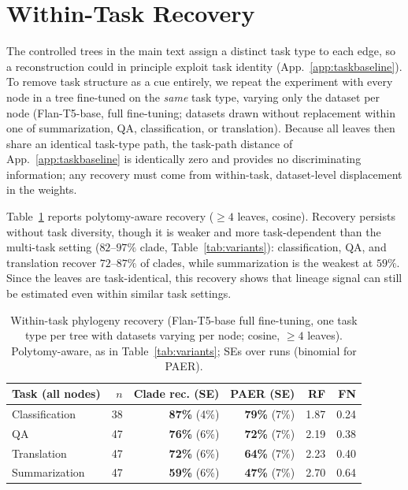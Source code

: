 \documentclass{article}
\theoremstyle{definition}
\theoremstyle{plain}
\begin{document}
\section{Within-Task Recovery}
\label{app:withintask}

The controlled trees in the main text assign a distinct task type to each edge, so a reconstruction
could in principle exploit task identity (App.~\ref{app:taskbaseline}). To remove task structure as a
cue entirely, we repeat the experiment with every node in a tree fine-tuned on the \emph{same} task
type, varying only the dataset per node (Flan-T5-base, full fine-tuning; datasets drawn without
replacement within one of summarization, QA, classification, or translation). Because all leaves then
share an identical task-type path, the task-path distance of App.~\ref{app:taskbaseline} is identically
zero and provides no discriminating information; any recovery must come from within-task,
dataset-level displacement in the weights.

Table~\ref{tab:withintask} reports polytomy-aware recovery ($\geq 4$ leaves, cosine). Recovery persists
without task diversity, though it is weaker and more task-dependent than the multi-task setting
($82$--$97\%$ clade, Table~\ref{tab:variants}): classification, QA, and translation recover $72$--$87\%$
of clades, while summarization is the weakest at $59\%$.
Since the leaves are task-identical, this recovery shows that lineage signal can still be estimated even within similar task settings.

\begin{table}[h]
\caption{Within-task phylogeny recovery (Flan-T5-base full fine-tuning, one task type per tree with
  datasets varying per node; cosine, $\geq 4$ leaves). Polytomy-aware, as in
  Table~\ref{tab:variants}; SEs over runs (binomial for PAER).}
\label{tab:withintask}
\centering
\small
\begin{tabular}{lrrrrr}
\toprule
Task (all nodes) & $n$ & Clade rec. (SE) & PAER (SE) & RF & FN \\
\midrule
Classification & 38 & \textbf{87\%} (4\%) & \textbf{79\%} (7\%) & 1.87 & 0.24 \\
QA             & 47 & \textbf{76\%} (6\%) & \textbf{72\%} (7\%) & 2.19 & 0.38 \\
Translation    & 47 & \textbf{72\%} (6\%) & \textbf{64\%} (7\%) & 2.23 & 0.40 \\
Summarization  & 47 & \textbf{59\%} (6\%) & \textbf{47\%} (7\%) & 2.70 & 0.64 \\
\bottomrule
\end{tabular}
\end{table}
\end{document}
